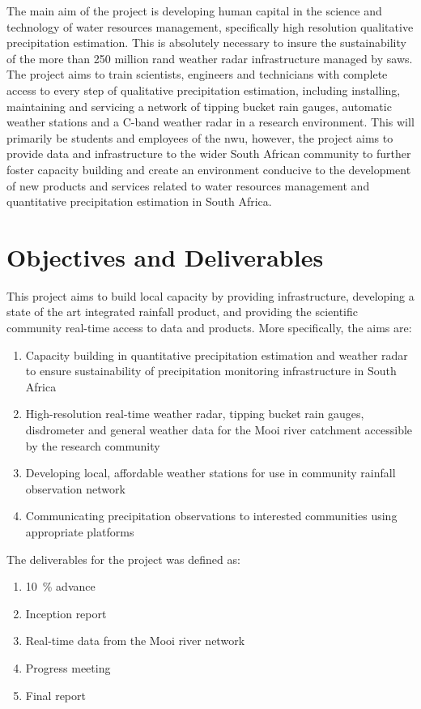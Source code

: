 \documentclass{wrcreport}
\begin{document}
The main aim of the project is developing human capital in the science
and technology of water resources management, specifically high
resolution qualitative precipitation estimation. This is absolutely
necessary to insure the sustainability of the more than 250 million
rand weather radar infrastructure managed by \gls{saws}. The project
aims to train scientists, engineers and technicians with complete
access to every step of qualitative precipitation estimation,
including installing, maintaining and servicing a network of tipping
bucket rain gauges, automatic weather stations and a C-band weather
radar in a research environment. This will primarily be students and
employees of the \gls{nwu}, however, the project aims to provide data
and infrastructure to the wider South African community to further
foster capacity building and create an environment conducive to the
development of new products and services related to water resources
management and quantitative precipitation estimation in South Africa. 

\section{Objectives and Deliverables}
\label{sec:obj}

This project aims to build local capacity by providing infrastructure,
developing a state of the art integrated rainfall product, and
providing the scientific community real-time access to data and
products. More specifically, the aims are:

\begin{enumerate}
\item Capacity building in quantitative precipitation estimation and
    weather radar to ensure sustainability of precipitation monitoring
    infrastructure in South Africa \item High-resolution real-time weather
    radar, tipping bucket rain gauges, disdrometer and general weather
    data for the Mooi river catchment accessible by the research community
\item Developing local, affordable weather stations for use in community rainfall observation network
\item Communicating precipitation observations to interested communities using appropriate platforms
\end{enumerate}

The deliverables for the project was defined as:

\begin{enumerate}
\item \SI{10}{\percent} advance
\item Inception report
\item Real-time data from the Mooi river network 
\item Progress meeting 
\item Final report
\end{enumerate}
\end{document}
